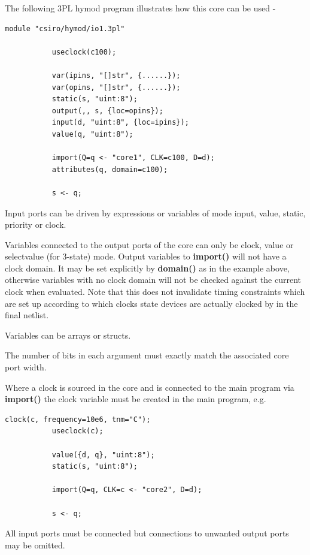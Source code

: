         The following 3PL hymod program illustrates how this core can be
        used -
        \begin{lstlisting}[gobble=8, language=threepl]
           module "csiro/hymod/io1.3pl"

           useclock(c100);

           var(ipins, "[]str", {......});
           var(opins, "[]str", {......});
           static(s, "uint:8"); 
           output(,, s, {loc=opins});
           input(d, "uint:8", {loc=ipins});
           value(q, "uint:8");

           import(Q=q <- "core1", CLK=c100, D=d);
           attributes(q, domain=c100);

           s <- q;
        \end{lstlisting}

        Input ports can be driven by expressions or variables of mode
        input, value, static, priority or clock.

        Variables connected to the output ports of the core can only
        be clock, value or selectvalue (for 3-state) mode. Output
        variables to {\bf import()} will not have a clock domain. It may be
        set explicitly by {\bf domain()} as in the example above, otherwise
        variables with no clock domain will not be checked against
        the current clock when evaluated. Note that this does not invalidate
        timing constraints which are set up according to which clocks state
        devices are actually clocked by in the final netlist.

        Variables can be arrays or structs.

        The number of bits in each argument must exactly match the
        associated core port width.

        Where a clock is sourced in the core and is connected to the
        main program via {\bf import()} the clock variable must
        be created in the main program, e.g.
        \begin{lstlisting}[gobble=8, language=threepl]
           clock(c, frequency=10e6, tnm="C");
           useclock(c);

           value({d, q}, "uint:8");
           static(s, "uint:8");

           import(Q=q, CLK=c <- "core2", D=d);

           s <- q;
        \end{lstlisting}
        All input ports must be connected but connections to unwanted output
        ports may be omitted.

